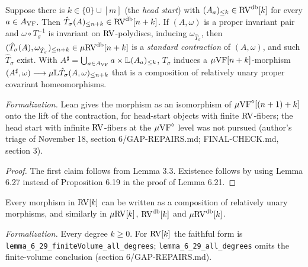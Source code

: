 \setcounter{theorem}{27}
\begin{remark}
\label{stand-vol}
\leanok
{}
Suppose there is $k\in\{0\}\cup[m]$ (the \emph{head start}) with $(A_a)_{\leq k}\in\mathrm{RV}^{\operatorname{db}}[k]$ for every $a\in A_{\mathrm{VF}}$. Then $\hat T_\sigma(A)_{\leq n+k}\in\mathrm{RV}^{\operatorname{db}}[n+k]$. If $(A,\omega)$ is a proper invariant pair and $\omega\circ T_\sigma^{-1}$ is invariant on $\mathrm{RV}$-polydiscs, inducing $\omega_{\hat T_\sigma}$, then $(\hat T_\sigma(A),\omega_{\hat T_\sigma})_{\leq n+k}\in\mu\mathrm{RV}^{\operatorname{db}}[n+k]$ is a \emph{standard contraction} of $(A,\omega)$, and such $\hat T_\sigma$ exist. With $A^\sharp=\bigcup_{a\in A_{\mathrm{VF}}}a\times\mathbb{L}(A_a)_{\leq k}$, $T_\sigma$ induces a $\mu\mathrm{VF}[n+k]$-morphism $(A^\sharp,\omega)\longrightarrow\mu\mathbb{L}\hat T_\sigma(A,\omega)_{\leq n+k}$ that is a composition of relatively unary proper covariant homeomorphisms.

\emph{Formalization.} Lean gives the morphism as an isomorphism of $\mu\mathrm{VF}^{\diamond}[(n+1)+k]$ onto the lift of the contraction, for head-start objects with finite $\mathrm{RV}$-fibers; the head start with infinite $\mathrm{RV}$-fibers at the $\mu\mathrm{VF}^{\diamond}$ level was not pursued (author's triage of November 18, section 6/GAP-REPAIRS.md; FINAL-CHECK.md, section 3).
\end{remark}

\begin{proof}
The first claim follows from Lemma 3.3. Existence follows by using Lemma 6.27 instead of Proposition 6.19 in the proof of Lemma 6.21.
\end{proof}

\setcounter{theorem}{28}
\begin{lemma}
\label{bijection-partitioned-unary}
\leanok
{}
Every morphism in $\mathrm{RV}[k]$ can be written as a composition of relatively unary morphisms, and similarly in $\mu\mathrm{RV}[k]$, $\mathrm{RV}^{\operatorname{db}}[k]$ and $\mu\mathrm{RV}^{\operatorname{db}}[k]$.

\emph{Formalization.} Every degree $k\geq0$. For $\mathrm{RV}[k]$ the faithful form is \texttt{lemma\_6\_29\_finiteVolume\_all\_degrees}; \texttt{lemma\_6\_29\_all\_degrees} omits the finite-volume conclusion (section 6/GAP-REPAIRS.md).
\end{lemma}

